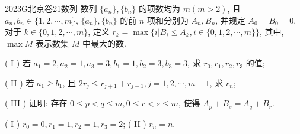 
\begin{problem}{2023}{G}{北京卷}{21}{数列}
数列 $\{a_n\}, \{b_n\}$ 的项数均为 $m(m>2)$, 且 $a_n, b_n \in \{1, 2, \cdots, m\}$, $\{a_n\}, \{b_n\}$ 的前 $n$ 项和分别为 $A_n, B_n$, 并规定 $A_0=B_0=0$. 对于 $k \in \{0, 1, 2, \cdots, m\}$, 定义 $r_k = \max\{i | B_i \leqslant A_k, i \in \{0, 1, 2, \cdots, m\}\}$, 其中, $\max M$ 表示数集 $M$ 中最大的数.

( I ) 若 $a_1=2, a_2=1, a_3=3, b_1=1, b_2=3, b_3=3$, 求 $r_0, r_1, r_2, r_3$ 的值;

( II ) 若 $a_1 \geqslant b_1$, 且 $2r_j \leqslant r_{j+1} + r_{j-1}, j=1, 2, \cdots, m-1$, 求 $r_n$;

( III ) 证明: 存在 $0 \leqslant p < q \leqslant m, 0 \leqslant r < s \leqslant m$, 使得 $A_p + B_s = A_q + B_r$.
\end{problem}

\begin{answer}
( I ) $r_0=0, r_1=1, r_2=1, r_3=2$; ( II ) $r_n=n$.
\end{answer}

